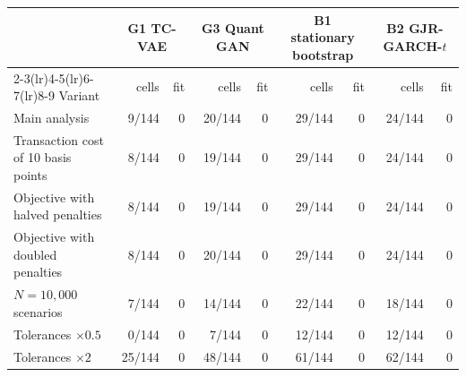 \begin{tabular}{lrrrrrrrr}
\toprule
& \multicolumn{2}{c}{G1 TC-VAE} & \multicolumn{2}{c}{G3 Quant GAN} & \multicolumn{2}{c}{B1 stationary bootstrap} & \multicolumn{2}{c}{B2 GJR-GARCH-$t$} \\
\cmidrule(lr){2-3}\cmidrule(lr){4-5}\cmidrule(lr){6-7}\cmidrule(lr){8-9}
Variant & cells & fit & cells & fit & cells & fit & cells & fit \\
\midrule
Main analysis & 9/144 & 0 & 20/144 & 0 & 29/144 & 0 & 24/144 & 0 \\
Transaction cost of 10 basis points & 8/144 & 0 & 19/144 & 0 & 29/144 & 0 & 24/144 & 0 \\
Objective with halved penalties & 8/144 & 0 & 19/144 & 0 & 29/144 & 0 & 24/144 & 0 \\
Objective with doubled penalties & 8/144 & 0 & 20/144 & 0 & 29/144 & 0 & 24/144 & 0 \\
$N=10{,}000$ scenarios & 7/144 & 0 & 14/144 & 0 & 22/144 & 0 & 18/144 & 0 \\
Tolerances $\times0.5$ & 0/144 & 0 & 7/144 & 0 & 12/144 & 0 & 12/144 & 0 \\
Tolerances $\times2$ & 25/144 & 0 & 48/144 & 0 & 61/144 & 0 & 62/144 & 0 \\
\bottomrule
\end{tabular}

